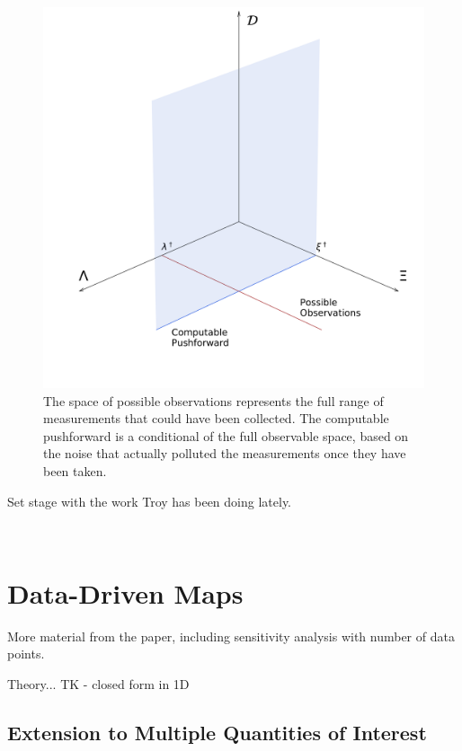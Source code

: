 \begin{figure}[ht]
\begin{minipage}{.975\textwidth}
\includegraphics[width=\linewidth]{./images/stochastic_framework.pdf}
\end{minipage}
\caption{
The space of possible observations represents the full range of measurements that could have been collected.
The computable pushforward is a conditional of the full observable space, based on the noise that actually polluted the measurements once they have been taken.
}
\label{fig:stochastic_framework}
\end{figure}
\FloatBarrier

Set stage with the work Troy has been doing lately.

\
\section{Data-Driven Maps}

More material from the paper, including sensitivity analysis with number of data points.

Theory... TK - closed form in 1D


\subsection{Extension to Multiple Quantities of Interest}

